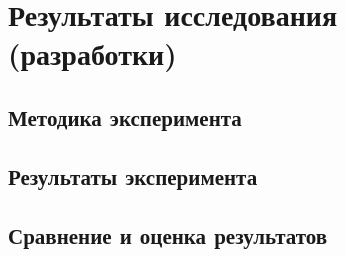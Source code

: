\chapter{Результаты исследования (разработки)}
\section{Методика эксперимента}
\section{Результаты эксперимента}
\section{Сравнение и оценка результатов}
